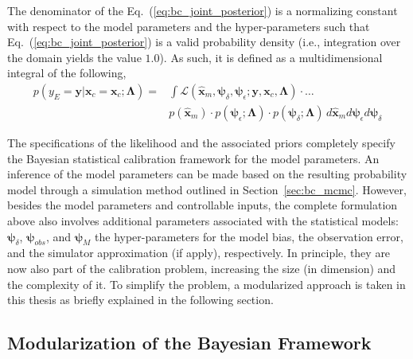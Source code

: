 The denominator of the Eq.~(\ref{eq:bc_joint_posterior}) is a normalizing constant with respect to the model parameters and the hyper-parameters such that Eq.~(\ref{eq:bc_joint_posterior}) is a valid probability density (i.e., integration over the domain yields the value $1.0$).
As such, it is defined as a multidimensional integral of the following,
\begin{equation}
	\begin{split}
	p(y_E = \mathbf{y} | \bm{x}_c = \mathbf{x}_c ; \bm{\Lambda}) = & \int \mathcal{L}(\hat{\bm{x}}_m,\bm{\psi}_\delta, \bm{\psi}_\epsilon ;  \mathbf{y}, \mathbf{x}_c, \bm{\Lambda}) \cdot \ldots \\
	& p(\hat{\bm{x}}_m) \cdot p(\bm{\psi}_\epsilon; \bm{\Lambda}) \cdot p(\bm{\psi}_\delta; \bm{\Lambda}) \, d\hat{\bm{x}}_m d\bm{\psi}_\epsilon d\bm{\psi}_\delta
	\end{split}
\label{eq:bc_normalizing_constant}
\end{equation}

The specifications of the likelihood and the associated priors completely specify the Bayesian statistical calibration framework for the model parameters.
An inference of the model parameters can be made based on the resulting probability model through a simulation method outlined in Section~\ref{sec:bc_mcmc}.
However, besides the model parameters and controllable inputs, the complete formulation above also involves additional parameters associated with the statistical models: $\bm{\psi}_\delta$, $\bm{\psi}_{obs}$, and $\bm{\psi}_M$ the hyper-parameters for the model bias, the observation error, and the simulator approximation (if apply), respectively.
In principle, they are now also part of the calibration problem, increasing the size (in dimension) and the complexity of it.
To simplify the problem, a modularized approach is taken in this thesis as briefly explained in the following section.

\subsection{Modularization of the Bayesian Framework}\label{sub:bc_modularization}

